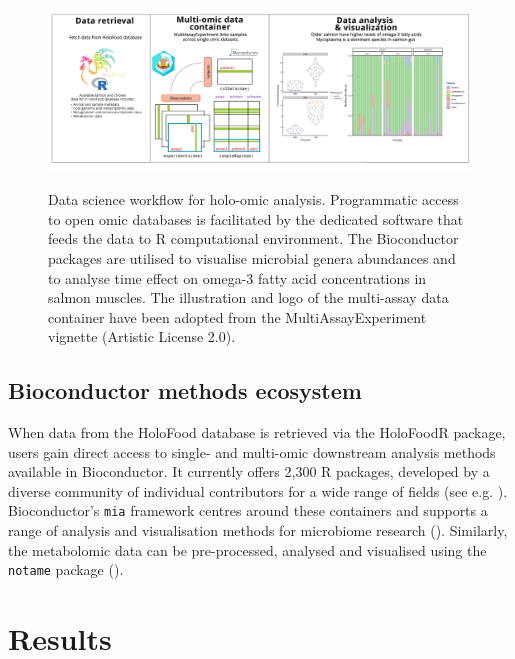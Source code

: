 \documentclass[unnumsec,webpdf,namedate,modern,large]{oup-authoring-template}%
\begin{document}
\vspace{-1em}

\begin{figure}[t]
	\centering
    \includegraphics[width=1\textwidth]{holofoodr_workflow_9.png}
    \label{fig:workflow}
    \caption{Data science workflow for holo-omic analysis. Programmatic access to open omic databases is facilitated by the dedicated software that feeds the data to R computational environment. The Bioconductor packages are utilised to visualise microbial genera abundances and to analyse  time effect on omega-3 fatty acid concentrations in salmon muscles. The illustration and logo of the multi-assay data container have been adopted from the MultiAssayExperiment vignette (Artistic License 2.0).}
	\label{fig:workflow}
\end{figure}

\vspace{-1em}
\subsection{Bioconductor methods ecosystem}

When data from the HoloFood database is retrieved via the HoloFoodR package, users gain direct access to single- and multi-omic downstream analysis methods available in Bioconductor. It currently offers 2,300 R packages, developed by a diverse community of individual contributors for a wide range of fields (see e.g. \cite{gentleman_bioconductor_2004,callahan_bioconductor_2016,amezquita_orchestrating_2020,drnevich_2025}). Bioconductor's \texttt{mia} framework centres around these containers and supports a range of analysis and visualisation methods for microbiome research (\cite{oma}). Similarly, the metabolomic data can be pre-processed, analysed and visualised using the \texttt{notame} package (\cite{klavus_2020}).

\section{Results}
\end{document}
